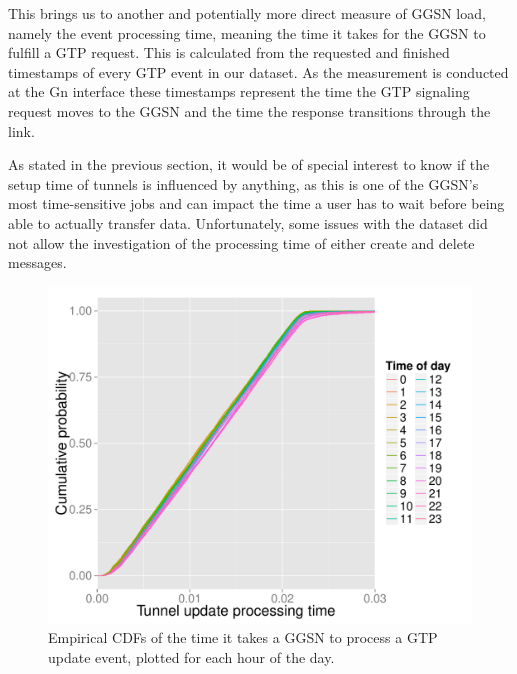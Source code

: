 This brings us to another and potentially more direct measure of \gls{GGSN} load, namely the event processing time, meaning the time it takes for the \gls{GGSN} to fulfill a \gls{GTP} request. This is calculated from the requested and finished timestamps of every \gls{GTP} event in our dataset. As the measurement is conducted at the Gn interface these timestamps represent the time the \gls{GTP} signaling request moves to the \gls{GGSN} and the time the response transitions through the link.

As stated in the previous section, it would be of special interest to know if the setup time of tunnels is influenced by anything, as this is one of the \gls{GGSN}'s most time-sensitive jobs and can impact the time a user has to wait before being able to actually transfer data. Unfortunately, some issues with the dataset did not allow the investigation of the processing time of either create and delete messages.

\begin{figure}[htbp]
	\centering
	\includegraphics[width=\columnwidth]{images/R-update-time-cdfs.pdf}
	\caption{Empirical CDFs of the time it takes a GGSN to process a GTP update event, plotted for each hour of the day.}
	\label{c4:fig:update-time}
\end{figure}


